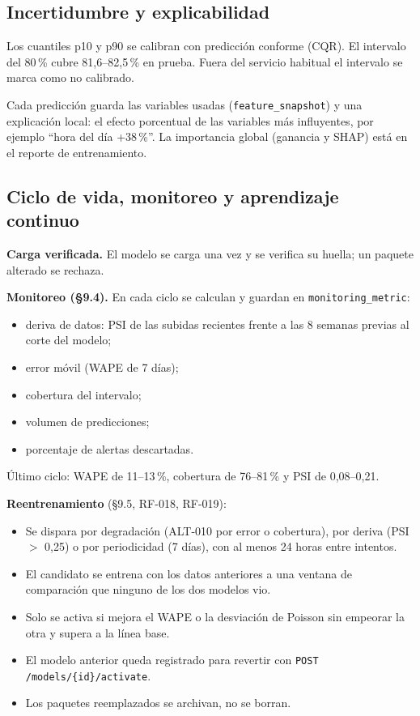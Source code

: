 \documentclass[10pt,a4paper]{article}
\newcommand{\cod}[1]{\texttt{\small #1}}
\begin{document}
\subsection{Incertidumbre y explicabilidad}

Los cuantiles p10 y p90 se calibran con predicción conforme (CQR). El intervalo del 80\,\% cubre 81,6--82,5\,\% en prueba. Fuera del servicio habitual el intervalo se marca como no calibrado.

Cada predicción guarda las variables usadas (\cod{feature\_snapshot}) y una explicación local: el efecto porcentual de las variables más influyentes, por ejemplo ``hora del día +38\,\%''. La importancia global (ganancia y SHAP) está en el reporte de entrenamiento.

\subsection{Ciclo de vida, monitoreo y aprendizaje continuo}

\textbf{Carga verificada.} El modelo se carga una vez y se verifica su huella; un paquete alterado se rechaza.

\textbf{Monitoreo (§9.4).} En cada ciclo se calculan y guardan en \cod{monitoring\_metric}:

\begin{itemize}
  \item deriva de datos: PSI de las subidas recientes frente a las 8 semanas previas al corte del modelo;
  \item error móvil (WAPE de 7 días);
  \item cobertura del intervalo;
  \item volumen de predicciones;
  \item porcentaje de alertas descartadas.
\end{itemize}

Último ciclo: WAPE de 11--13\,\%, cobertura de 76--81\,\% y PSI de 0,08--0,21.

\textbf{Reentrenamiento} (§9.5, RF-018, RF-019):

\begin{itemize}
  \item Se dispara por degradación (ALT-010 por error o cobertura), por deriva (PSI $>$ 0,25) o por periodicidad (7 días), con al menos 24 horas entre intentos.
  \item El candidato se entrena con los datos anteriores a una ventana de comparación que ninguno de los dos modelos vio.
  \item Solo se activa si mejora el WAPE o la desviación de Poisson sin empeorar la otra y supera a la línea base.
  \item El modelo anterior queda registrado para revertir con \cod{POST /models/\{id\}/activate}.
  \item Los paquetes reemplazados se archivan, no se borran.
\end{itemize}
\end{document}
